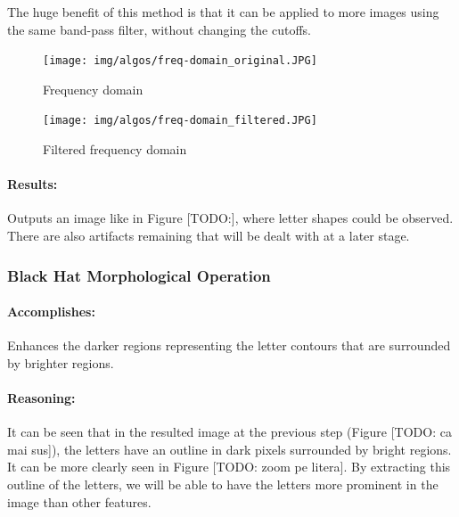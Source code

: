 The huge benefit of this method is that it can be applied to more images using the same band-pass filter, without changing the cutoffs.

\begin{figure}
        \centering
        \begin{minipage}[c]{0.4\linewidth}
        \centering
        \texttt{[image: img/algos/freq-domain\_original.JPG]}
        \caption{Frequency domain}
        \label{fig:freq-domain-original}
    \end{minipage}
    \begin{minipage}[c]{0.4\linewidth}
        \centering
        \texttt{[image: img/algos/freq-domain\_filtered.JPG]}
        \caption{Filtered frequency domain}
        \label{fig:freq-domain-filtered}
    \end{minipage}
\end{figure}

\paragraph*{Results:}\mbox{}\par
Outputs an image like in Figure [TODO:], where letter shapes could be observed. There are also artifacts remaining that will be dealt with at a later stage.

\subsubsection{Black Hat Morphological Operation}
\label{subsubsec:bh-morpho-op}

\paragraph*{Accomplishes:}\mbox{}\par
Enhances the darker regions representing the letter contours that are surrounded by brighter regions.

\paragraph*{Reasoning:}\mbox{}\par
It can be seen that in the resulted image at the previous step (Figure [TODO: ca mai sus]), the letters have an outline in dark pixels surrounded by bright regions. It can be more clearly seen in Figure [TODO: zoom pe litera]. By extracting this outline of the letters, we will be able to have the letters more prominent in the image than other features.

